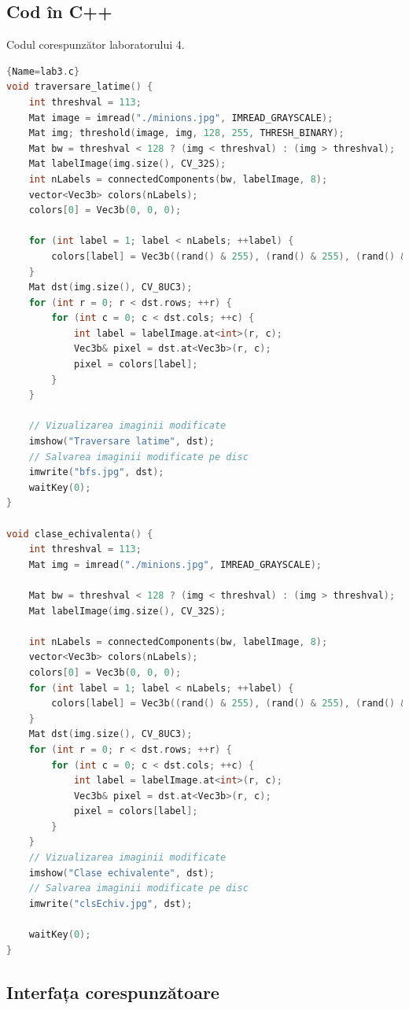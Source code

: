 \documentclass{amsart}
\begin{document}
\subsection{Cod \^{i}n C++}

Codul corespunzător laboratorului 4.

\begin{lstlisting}[language=C++]{Name=lab3.c}
void traversare_latime() {
	int threshval = 113;
	Mat image = imread("./minions.jpg", IMREAD_GRAYSCALE);
	Mat img; threshold(image, img, 128, 255, THRESH_BINARY);
	Mat bw = threshval < 128 ? (img < threshval) : (img > threshval);
	Mat labelImage(img.size(), CV_32S);
	int nLabels = connectedComponents(bw, labelImage, 8);
	vector<Vec3b> colors(nLabels);
	colors[0] = Vec3b(0, 0, 0);

	for (int label = 1; label < nLabels; ++label) {
		colors[label] = Vec3b((rand() & 255), (rand() & 255), (rand() & 255));
	}
	Mat dst(img.size(), CV_8UC3);
	for (int r = 0; r < dst.rows; ++r) {
		for (int c = 0; c < dst.cols; ++c) {
			int label = labelImage.at<int>(r, c);
			Vec3b& pixel = dst.at<Vec3b>(r, c);
			pixel = colors[label];
		}
	}

	// Vizualizarea imaginii modificate
	imshow("Traversare latime", dst);
	// Salvarea imaginii modificate pe disc 
	imwrite("bfs.jpg", dst);
	waitKey(0);
}

void clase_echivalenta() {
	int threshval = 113;
	Mat img = imread("./minions.jpg", IMREAD_GRAYSCALE);

	Mat bw = threshval < 128 ? (img < threshval) : (img > threshval);
	Mat labelImage(img.size(), CV_32S);

	int nLabels = connectedComponents(bw, labelImage, 8);
	vector<Vec3b> colors(nLabels);
	colors[0] = Vec3b(0, 0, 0);
	for (int label = 1; label < nLabels; ++label) {
		colors[label] = Vec3b((rand() & 255), (rand() & 255), (rand() & 255));
	}
	Mat dst(img.size(), CV_8UC3);
	for (int r = 0; r < dst.rows; ++r) {
		for (int c = 0; c < dst.cols; ++c) {
			int label = labelImage.at<int>(r, c);
			Vec3b& pixel = dst.at<Vec3b>(r, c);
			pixel = colors[label];
		}
	}
	// Vizualizarea imaginii modificate
	imshow("Clase echivalente", dst);
	// Salvarea imaginii modificate pe disc 
	imwrite("clsEchiv.jpg", dst);

	waitKey(0);
}
 \end{lstlisting}

\subsection{Interfața corespunzătoare}
\end{document}
